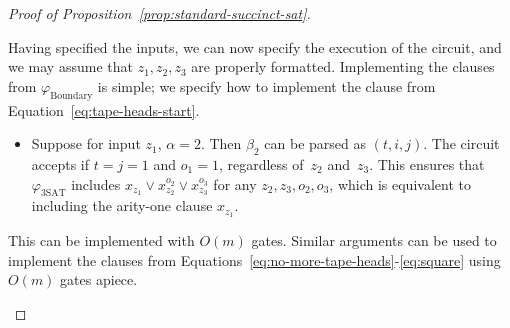\begin{proof}[Proof of Proposition~\ref{prop:standard-succinct-sat}]
\begin{definition}
  Having specified the inputs, we can now specify the execution of the circuit,
  and we may assume that $z_1, z_2, z_3$ are properly formatted.
  Implementing the clauses from $\varphi_{\mathrm{Boundary}}$ is simple; we
  specify how to implement the clause from Equation~\eqref{eq:tape-heads-start}.
  \begin{itemize}
  \item Suppose for input $z_1$, $\alpha = 2$.
    Then $\beta_2$ can be parsed as $(t, i, j)$.
    The circuit accepts if $t=j = 1$ and $o_1 = 1$, regardless of~$z_2$ and~$z_3$.
    This ensures that $\varphi_{\mathrm{3SAT}}$ includes $x_{z_1} \lor
    x_{z_2}^{o_2} \lor x_{z_3}^{o_3}$ for any $z_2, z_3, o_2, o_3$, which is
    equivalent to including the arity-one clause $x_{z_1}$.
  \end{itemize}
  This can be implemented with $O(m)$ gates.
  Similar arguments can be used to implement the clauses from
  Equations~\eqref{eq:no-more-tape-heads}-\eqref{eq:square} using $O(m)$ gates
  apiece.


\end{definition}
\end{proof}
